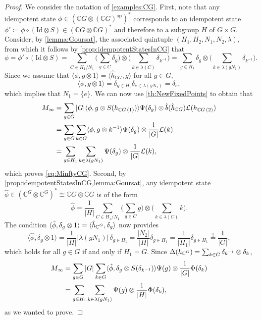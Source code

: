\documentclass[a4paper,10pt]{amsart}
\newcommand{\eval}[2]{\langle #1 , #2\rangle}
\theoremstyle{definition}
\begin{document}
\begin{proof}
    We consider the notation of \cref{examples:CG}.
    First, note that any idempotent state $\phi \in (\mathbb{C}G \otimes (\mathbb{C}G)^{\mathrm{op}})^*$ corresponds to an idempotent state $\phi'\coloneqq \phi \circ (\mathrm{Id} \otimes S) \in (\mathbb{C}G \otimes \mathbb{C}G)^*$ and therefore to a subgroup $H$ of $G\times G$.
    Consider, by \cref{lemma:Goursat}, the associated quintuple $(H_1, H_2, N_1, N_2, \lambda)$, from which it follows by \cref{prop:idempotentStatesInCG} that
    \[
        \phi = \phi' \circ (\mathrm{Id} \otimes S)
        =
        \sum_{C\in H_1/N_1}
            \big( \sum_{g\in C} \delta_g \big)
                \otimes
                    \big( \sum_{k\in \lambda(C)} \delta_{k^{-1}} \big)
        =
            \sum_{g\in H_1} \delta_g \otimes \big(\sum_{k\in \lambda(gN_1)} \delta_{k^{-1}}\big).
    \]
    Since we assume that $\eval{\phi}{g \otimes 1}=\eval{\hat{h}_{\mathbb{C}G}}{g}$ for all $g\in G$, 
    \[
        \eval{\phi}{g \otimes 1}=\delta_{g\in H_1} \delta_{e\in \lambda(gN_1)}=\delta_e,
    \]
    which implies that $N_1=\{e\}$.
    We can now use \cref{th:NewFixedPoints} to obtain that
    \begin{align*}
		M_{\smash{\infty}}
        &=
        \sum_{g\in G} |G| \eval{\phi}{g\otimes S(h_{\mathbb{C}G\,(1)})}  \Psi(\delta_g) \otimes \hat{b}(\hat{h}_{\mathbb{C}G}) \mathcal{L}(h_{\mathbb{C}G\,(2)})
		\\
        & =
            \sum_{g\in G} \sum_{k\in G}  \eval{\phi}{g\otimes k^{-1}}  \Psi(\delta_g) \otimes \frac{1}{|G|} \mathcal{L}(k)
        \\
        &=
        \sum_{g\in H_1} \sum_{k\in \lambda(gN_1)}  \Psi(\delta_g) \otimes \frac{1}{|G|} \mathcal{L}(k),
	\end{align*}
    which proves \cref{eq:MinftyCG}.
    Second, by \cref{prop:idempotentStatesInCG,lemma:Goursat}, any idempotent state $\hat\phi\in (\mathbb{C}^G\otimes \mathbb{C}^G)^*\cong \mathbb{C}G\otimes\mathbb{C}G$ is of the form
    \[
        \hat\phi =
        \frac{1}{|H|} \sum_{C\in H_1/N_1} \big( \sum_{g\in C} g \big) \otimes \big( \sum_{k\in \lambda(C)}  k \big).
    \]
    The condition $\eval{\hat\phi}{\delta_g \otimes 1}=\eval{\hat{h}_{\smash{\mathbb{C}^G}}}{\delta_g}$ now provides
    \[
        \eval{\hat\phi}{\delta_g \otimes 1}
        =
        \frac{1}{|H|}|\lambda(gN_1)|\,\delta_{g\in H_1}
        =
        \frac{|N_2|}{|H|}\delta_{g\in H_1}
        =
        \frac{1}{|H_1|}\delta_{g\in H_1}
        \overset{!}{=}
        \frac{1}{|G|},
    \]
    which holds for all $g\in G$ if and only if $H_1=G$.
    Since $\Delta(h_{\smash{\mathbb{C}^G}}) = \sum_{k\in G} \delta_{\smash{k^{-1}}} \otimes \delta_k$,
    \begin{align*}
		M_{\smash{\infty}}
		    & = \sum_{g\in G} |G| \sum_{k\in G} \eval{\hat\phi}{\delta_g\otimes S(\delta_{k^{-1}})}  \Psi(g) \otimes \frac{1}{|G|} \Phi(\delta_k)\\
            &= \sum_{g\in H_1} \sum_{k\in \lambda(gN_1)}  \Psi(g) \otimes \frac{1}{|H|} \Phi(\delta_k),
	\end{align*}
    as we wanted to prove.
\end{proof}
\end{document}
